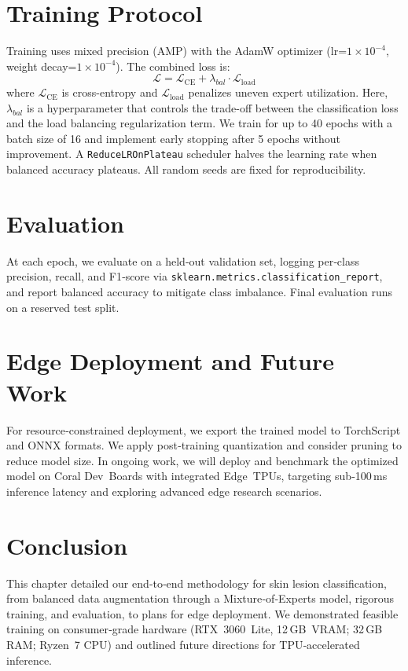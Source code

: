 \section{Training Protocol}
Training uses mixed precision (AMP) with the AdamW optimizer (lr=$1\times10^{-4}$, weight decay=$1\times10^{-4}$). The combined loss is:
\begin{equation}
\mathcal{L} = \mathcal{L}_{\mathrm{CE}} + \lambda_{bal} \cdot \mathcal{L}_{\mathrm{load}}
\end{equation}
where $\mathcal{L}_{\mathrm{CE}}$ is cross-entropy and $\mathcal{L}_{\mathrm{load}}$ penalizes uneven expert utilization. Here, $\lambda_{bal}$ is a hyperparameter that controls the trade-off between the classification loss and the load balancing regularization term. We train for up to 40 epochs with a batch size of 16 and implement early stopping after 5 epochs without improvement. A \texttt{ReduceLROnPlateau} scheduler halves the learning rate when balanced accuracy plateaus. All random seeds are fixed for reproducibility.

\section{Evaluation}
At each epoch, we evaluate on a held‑out validation set, logging per‑class precision, recall, and F1‑score via \texttt{sklearn.metrics.classification\_report}, and report balanced accuracy to mitigate class imbalance. Final evaluation runs on a reserved test split.

\section{Edge Deployment and Future Work}
For resource‑constrained deployment, we export the trained model to TorchScript and ONNX formats. We apply post‑training quantization and consider pruning to reduce model size. In ongoing work, we will deploy and benchmark the optimized model on Coral Dev Boards with integrated Edge TPUs, targeting sub‑100 ms inference latency and exploring advanced edge research scenarios.

\section{Conclusion}
This chapter detailed our end‑to‑end methodology for skin lesion classification, from balanced data augmentation through a Mixture‑of‑Experts model, rigorous training, and evaluation, to plans for edge deployment. We demonstrated feasible training on consumer‑grade hardware (RTX 3060 Lite, 12 GB VRAM; 32 GB RAM; Ryzen 7 CPU) and outlined future directions for TPU‑accelerated inference.

